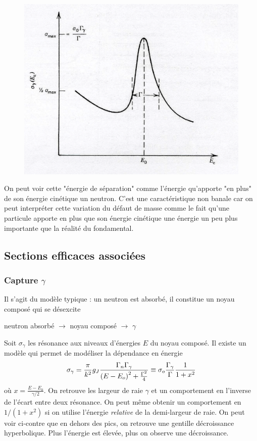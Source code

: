 	\begin{figure}
	\vspace{-8mm}
	\includegraphics[scale=0.17]{ch1/image9.png}
	\end{figure}
	
On peut voir cette "énergie de séparation" comme l'énergie qu'apporte "en plus" de son énergie 
cinétique un neutron. C'est une caractéristique non banale car on peut interpréter cette variation 
du défaut de masse comme le fait qu'une particule apporte en plus que son énergie cinétique une 
énergie un peu plus importante que la réalité du fondamental. 

\subsection{Sections efficaces associées}
\subsubsection{Capture $\gamma$}
Il s'agit du modèle typique : un neutron est absorbé, il constitue un noyau composé qui se 
désexcite
\begin{center}
neutron absorbé $\longrightarrow$ noyau composé $\longrightarrow$ $\gamma$
\end{center}
Soit $\sigma_\gamma$ les résonance aux niveaux d'énergies $E$ du noyau composé. Il existe un 
modèle qui permet de modéliser la dépendance en énergie
\begin{equation}
{\sigma _\gamma } = \frac{\pi }{{{k^2}}}{g_J}\frac{{{\Gamma _n}{\Gamma _\gamma }}}{{{{(E - {E_o})}^2} + {\textstyle{{{\Gamma ^2}} \over 4}}}} \equiv {\sigma _o}\frac{{{\Gamma _\gamma }}}{\Gamma }\frac{1}{{1 + {x^2}}}
\end{equation}
où $x= \frac{E-E_0}{\gamma/2}$. On retrouve les largeur de raie $\gamma$ et un comportement en 
l'inverse de l'écart entre deux résonance. On peut même obtenir un comportement en $1/(1+x^2)$ si 
on utilise l'énergie \textit{relative} de la demi-largeur de raie. On peut voir ci-contre que 
en dehors des pics, on retrouve une gentille décroissance hyperbolique. Plus l'énergie est élevée, 
plus on observe une décroissance.

